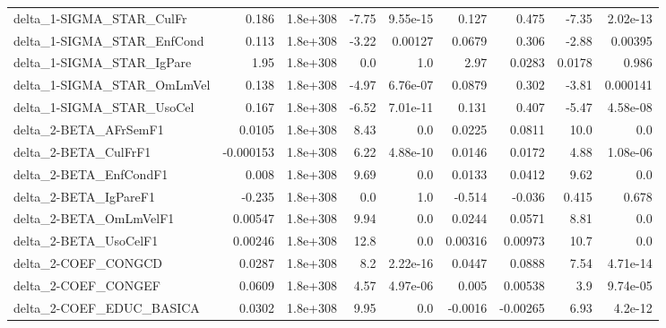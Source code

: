 \begin{tabular}{lrrrrrrrr}
delta\_1-SIGMA\_STAR\_CulFr              &       0.186 &     1.8e+308 &   -7.75 & 9.55e-15 &      0.127 &       0.475 &        -7.35 &      2.02e-13 \\
delta\_1-SIGMA\_STAR\_EnfCond            &       0.113 &     1.8e+308 &   -3.22 &  0.00127 &     0.0679 &       0.306 &        -2.88 &       0.00395 \\
delta\_1-SIGMA\_STAR\_IgPare             &        1.95 &     1.8e+308 &     0.0 &      1.0 &       2.97 &      0.0283 &       0.0178 &         0.986 \\
delta\_1-SIGMA\_STAR\_OmLmVel            &       0.138 &     1.8e+308 &   -4.97 & 6.76e-07 &     0.0879 &       0.302 &        -3.81 &      0.000141 \\
delta\_1-SIGMA\_STAR\_UsoCel             &       0.167 &     1.8e+308 &   -6.52 & 7.01e-11 &      0.131 &       0.407 &        -5.47 &      4.58e-08 \\
delta\_2-BETA\_AFrSemF1                 &      0.0105 &     1.8e+308 &    8.43 &      0.0 &     0.0225 &      0.0811 &         10.0 &           0.0 \\
delta\_2-BETA\_CulFrF1                  &   -0.000153 &     1.8e+308 &    6.22 & 4.88e-10 &     0.0146 &      0.0172 &         4.88 &      1.08e-06 \\
delta\_2-BETA\_EnfCondF1                &       0.008 &     1.8e+308 &    9.69 &      0.0 &     0.0133 &      0.0412 &         9.62 &           0.0 \\
delta\_2-BETA\_IgPareF1                 &      -0.235 &     1.8e+308 &     0.0 &      1.0 &     -0.514 &      -0.036 &        0.415 &         0.678 \\
delta\_2-BETA\_OmLmVelF1                &     0.00547 &     1.8e+308 &    9.94 &      0.0 &     0.0244 &      0.0571 &         8.81 &           0.0 \\
delta\_2-BETA\_UsoCelF1                 &     0.00246 &     1.8e+308 &    12.8 &      0.0 &    0.00316 &     0.00973 &         10.7 &           0.0 \\
delta\_2-COEF\_CONGCD                   &      0.0287 &     1.8e+308 &     8.2 & 2.22e-16 &     0.0447 &      0.0888 &         7.54 &      4.71e-14 \\
delta\_2-COEF\_CONGEF                   &      0.0609 &     1.8e+308 &    4.57 & 4.97e-06 &      0.005 &     0.00538 &          3.9 &      9.74e-05 \\
delta\_2-COEF\_EDUC\_BASICA              &      0.0302 &     1.8e+308 &    9.95 &      0.0 &    -0.0016 &    -0.00265 &         6.93 &       4.2e-12 \\

\end{tabular}
